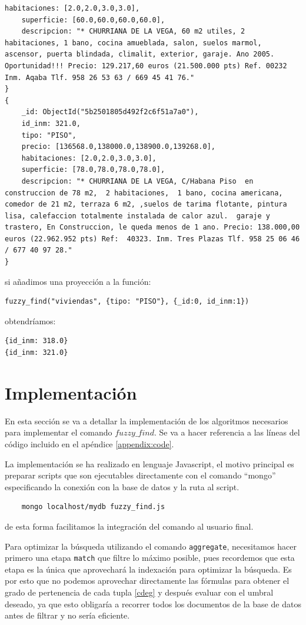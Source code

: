 \begin{example}
\begin{lstlisting}[numbers=none]
    habitaciones: [2.0,2.0,3.0,3.0],
    superficie: [60.0,60.0,60.0,60.0],
    descripcion: "* CHURRIANA DE LA VEGA, 60 m2 utiles, 2 habitaciones, 1 bano, cocina amueblada, salon, suelos marmol, ascensor, puerta blindada, climalit, exterior, garaje. Ano 2005. Oportunidad!!! Precio: 129.217,60 euros (21.500.000 pts) Ref. 00232 Inm. Aqaba Tlf. 958 26 53 63 / 669 45 41 76."
}
{
    _id: ObjectId("5b2501805d492f2c6f51a7a0"),
    id_inm: 321.0,
    tipo: "PISO",
    precio: [136568.0,138000.0,138900.0,139268.0],
    habitaciones: [2.0,2.0,3.0,3.0],
    superficie: [78.0,78.0,78.0,78.0],
    descripcion: "* CHURRIANA DE LA VEGA, C/Habana Piso  en construccion de 78 m2,  2 habitaciones,  1 bano, cocina americana, comedor de 21 m2, terraza 6 m2, ,suelos de tarima flotante, pintura lisa, calefaccion totalmente instalada de calor azul.  garaje y trastero, En Construccion, le queda menos de 1 ano. Precio: 138.000,00 euros (22.962.952 pts) Ref:  40323. Inm. Tres Plazas Tlf. 958 25 06 46 / 677 40 97 28."
}
\end{lstlisting}
%
si añadimos una proyección a la función:
%
\begin{verbatim}
fuzzy_find("viviendas", {tipo: "PISO"}, {_id:0, id_inm:1})
\end{verbatim}
%
obtendríamos:
%
\begin{lstlisting}[numbers=none]
{id_inm: 318.0}
{id_inm: 321.0}
\end{lstlisting}

\end{example}

\section{Implementación}

En esta sección se va a detallar la implementación de los algoritmos necesarios para implementar el comando $fuzzy\_find$. Se va a hacer referencia a las líneas del código incluido en el apéndice \ref{appendix:code}.

La implementación se ha realizado en lenguaje Javascript, el motivo principal es preparar scripts que son ejecutables directamente con el comando ``mongo'' especificando la conexión con la base de datos y la ruta al script.
%
\begin{verbatim}
    mongo localhost/mydb fuzzy_find.js
\end{verbatim}
%
de esta forma facilitamos la integración del comando al usuario final.

Para optimizar la búsqueda utilizando el comando \texttt{aggregate}, necesitamos hacer primero una etapa \texttt{match} que filtre lo máximo posible, pues recordemos que esta etapa es la única que aprovechará la indexación para optimizar la búsqueda. Es por esto que no podemos aprovechar directamente las fórmulas para obtener el grado de pertenencia de cada tupla \ref{cdeg} y después evaluar con el umbral deseado, ya que esto obligaría a recorrer todos los documentos de la base de datos antes de filtrar y no sería eficiente. 

